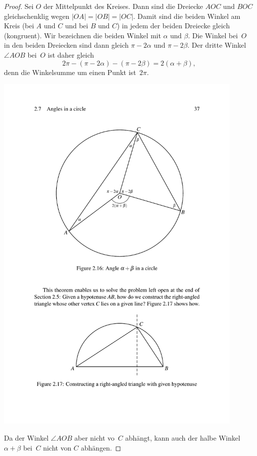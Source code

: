 \begin{proof}
Sei $O$ der Mittelpunkt des Kreises. Dann sind die Dreiecke
$AOC$ und $BOC$ gleichschenklig wegen $|OA|=|OB|=|OC|$.
Damit sind die beiden Winkel am Kreis (bei $A$ und $C$ und bei $B$ und
$C$) in jedem der beiden Dreiecke gleich (kongruent). 
Wir bezeichnen die beiden Winkel mit $\alpha$ und $\beta$.
Die Winkel bei~$O$ in den beiden Dreiecken sind dann gleich
$\pi-2\alpha$ und $\pi-2\beta$. 
Der dritte Winkel $\angle AOB$
bei~$O$ ist daher gleich 
$$
2\pi - (\pi-2\alpha) - (\pi-2\beta) = 2 (\alpha + \beta)
,
$$
denn die Winkelsumme um einen Punkt ist~$2\pi$.

\centerline{\includegraphics[width=12cm]{BILDER/BildInnenwinkelImKreis.pdf}}



Da der Winkel $\angle AOB$ aber nicht vo~$C$ abhängt, kann auch der halbe Winkel
$\alpha+\beta$ bei~$C$ nicht von $C$ abhängen.
\end{proof}







